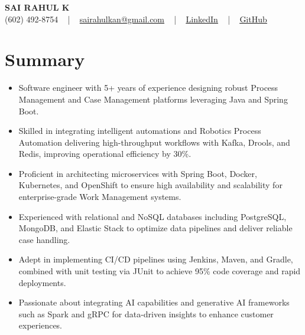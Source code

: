 \documentclass[letterpaper,11pt]{article}
\newcommand{\resumeItem}[1]{
  \item\footnotesize{
    {#1 \vspace{-2pt}}
  }
}
\newcommand{\resumeItemListStart}{\begin{itemize}[leftmargin=*]}
\newcommand{\resumeItemListEnd}{\end{itemize}\vspace{-5pt}}
\begin{document}
\begin{center}
    {\fontsize{14pt}{12pt}\selectfont \textbf{\MakeUppercase{Sai Rahul K}}}\\ \vspace{2pt}
    \fontsize{10pt}{12pt}\selectfont (602) 492-8754 ~ | ~ \href{mailto:sairahulkan@gmail.com}{sairahulkan@gmail.com} ~ | ~
    \href{https://www.linkedin.com/in/rq123/}{\color{blue}\underline{LinkedIn}} ~ | ~
    \href{https://github.com/kanrahuldo}{\color{blue}\underline{GitHub}}~
    \vspace{-8pt}
\end{center}

\section{Summary}
\fontsize{9pt}{10pt}\selectfont
\resumeItemListStart
    \resumeItem{Software engineer with 5+ years of experience designing robust Process Management and Case Management platforms leveraging Java and Spring Boot.}
    \resumeItem{Skilled in integrating intelligent automations and Robotics Process Automation delivering high-throughput workflows with Kafka, Drools, and Redis, improving operational efficiency by 30\%.}
    \resumeItem{Proficient in architecting microservices with Spring Boot, Docker, Kubernetes, and OpenShift to ensure high availability and scalability for enterprise-grade Work Management systems.}
    \resumeItem{Experienced with relational and NoSQL databases including PostgreSQL, MongoDB, and Elastic Stack to optimize data pipelines and deliver reliable case handling.}
    \resumeItem{Adept in implementing CI/CD pipelines using Jenkins, Maven, and Gradle, combined with unit testing via JUnit to achieve 95\% code coverage and rapid deployments.}
    \resumeItem{Passionate about integrating AI capabilities and generative AI frameworks such as Spark and gRPC for data-driven insights to enhance customer experiences.}
\resumeItemListEnd
\vspace{-6pt}
\end{document}
